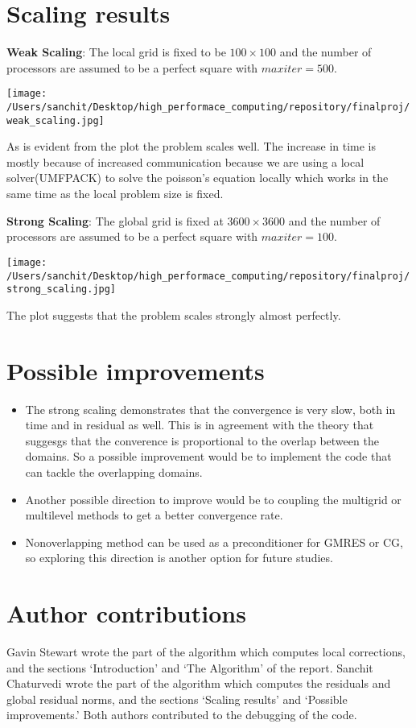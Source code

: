 \documentclass{article}
\begin{document}
	\section{Scaling results}
	\textbf{Weak Scaling}: The local grid is fixed to be $100\times100$ and the number of processors are assumed to be a perfect square with $max iter=500$. 
	
	\texttt{[image: /Users/sanchit/Desktop/high\_performace\_computing/repository/finalproj/weak\_scaling.jpg]}
	
	As is evident from the plot the problem scales well. The increase in time is mostly because of increased communication because we are using a local solver(UMFPACK) to solve the poisson's equation locally which works in the same time as the local problem size is fixed.
	
	\textbf{Strong Scaling}: The global grid is fixed at $3600\times3600$ and the number of processors are assumed to be a perfect square with $max iter=100$.
	
	\texttt{[image: /Users/sanchit/Desktop/high\_performace\_computing/repository/finalproj/strong\_scaling.jpg]}

The plot suggests that the problem scales strongly almost perfectly. 
	\section{Possible improvements}
	\begin{itemize}
\item	The strong scaling demonstrates that the convergence is very slow, both in time and in residual as well. This is in agreement with the theory that suggesgs that the converence is proportional to the overlap between the domains. So a possible improvement would be to implement the code that can tackle the overlapping domains. 
\item Another possible direction to improve would be to coupling the multigrid or multilevel methods to get a better convergence rate.
\item Nonoverlapping method can be used as a preconditioner for GMRES or CG, so exploring this direction is another option for future studies.
	\end{itemize}

	\section{Author contributions}
	
	Gavin Stewart wrote the part of the algorithm which computes local corrections, and the sections `Introduction' and `The Algorithm' of the report.  Sanchit Chaturvedi wrote the part of the algorithm which computes the residuals and global residual norms, and the sections `Scaling results' and `Possible improvements.'  Both authors contributed to the debugging of the code.
	
\end{document}
